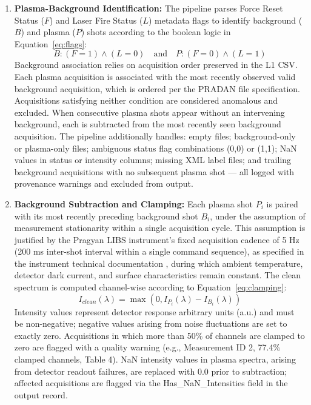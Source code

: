 \documentclass[final,5p,twocolumn,a4paper]{elsarticle}
\begin{document}
\begin{enumerate}
    \item \textbf{Plasma-Background Identification:} The pipeline parses Force Reset Status ($F$) and Laser Fire Status ($L$) metadata flags to identify background ($B$) and plasma ($P$) shots according to the boolean logic in Equation~\eqref{eq:flags}:
    \begin{equation}
        \label{eq:flags}
        B: (F = 1) \land (L = 0) \quad \text{and} \quad P: (F = 0) \land (L = 1)
    \end{equation}
    Background association relies on acquisition order preserved in the L1 CSV. Each plasma acquisition is associated with the most recently observed valid background acquisition, which is ordered per the PRADAN file specification. Acquisitions satisfying neither condition are considered anomalous and excluded. When consecutive plasma shots appear without an intervening background, each is subtracted from the most recently seen background acquisition. The pipeline additionally handles: empty files; background-only or plasma-only files; ambiguous status flag combinations (0,0) or (1,1); NaN values in status or intensity columns; missing XML label files; and trailing background acquisitions with no subsequent plasma shot — all logged with provenance warnings and excluded from output.
    \item \textbf{Background Subtraction and Clamping:} Each plasma shot $P_i$ is paired with its most recently preceding background shot $B_i$, under the assumption of measurement stationarity within a single acquisition cycle. This assumption is justified by the Pragyan LIBS instrument's fixed acquisition cadence of 5 Hz (200 ms inter-shot interval within a single command sequence), as specified in the instrument technical documentation \cite{libs_data_manual, libs_sis_ref}, during which ambient temperature, detector dark current, and surface characteristics remain constant. The clean spectrum is computed channel-wise according to Equation~\eqref{eq:clamping}:
    \begin{equation}
        \label{eq:clamping}
        I_{clean}(\lambda) = \max(0, I_{P_i}(\lambda) - I_{B_i}(\lambda))
    \end{equation}
    Intensity values represent detector response arbitrary units (a.u.) and must be non-negative; negative values arising from noise fluctuations are set to exactly zero. Acquisitions in which more than 50\% of channels are clamped to zero are flagged with a quality warning (e.g., Measurement ID 2, 77.4\% clamped channels, Table 4). NaN intensity values in plasma spectra, arising from detector readout failures, are replaced with 0.0 prior to subtraction; affected acquisitions are flagged via the Has\_NaN\_Intensities field in the output record.

\end{enumerate}
\end{document}
